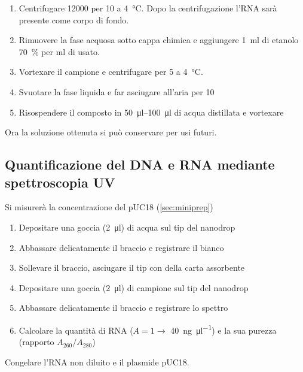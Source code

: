 \begin{enumerate}
	\item Centrifugare \qty{12000}{\giri} per \qty{10}{\min} a \qty{4}{\celsius}. Dopo la centrifugazione l’RNA sarà presente come corpo di fondo.
	\item Rimuovere la fase acquosa sotto cappa chimica e aggiungere \qty{1}{ml} di etanolo \qty{70}{\percent} per \unit{\ml} di \trizol usato.
	\item Vortexare il campione e centrifugare per \qty{5}{\min} a \qty{4}{\celsius}.
	\item Svuotare la fase liquida e far asciugare all’aria per \qty{10}{\min}
	\item Risospendere il composto in \qtyrange{50}{100}{\micro\litre} di acqua distillata e vortexare	
\end{enumerate}
Ora la soluzione ottenuta si può conservare per usi futuri.

\subsection{Quantificazione del DNA e RNA mediante spettroscopia UV}
\noindent Si misurerà la concentrazione del pUC18 (\autoref{sec:miniprep})
\begin{enumerate}
	\item Depositare una goccia (\qty{2}{\micro\litre}) di acqua sul tip del nanodrop
	\item Abbassare delicatamente il braccio e registrare il bianco
	\item Sollevare il braccio, asciugare il tip con della carta assorbente
	\item Depositare una goccia (\qty{2}{\micro\litre}) di campione sul tip del nanodrop
	\item Abbassare delicatamente il braccio e registrare lo spettro
	\item Calcolare la quantità di RNA (\(A=1\to\) \qty{40}{\ng\per\micro\litre}) e la sua purezza (rapporto \(A_{260}/A_{280}\))
\end{enumerate}
Congelare l'RNA non diluito e il plasmide pUC18.





\begingroup
\newpage
{}

